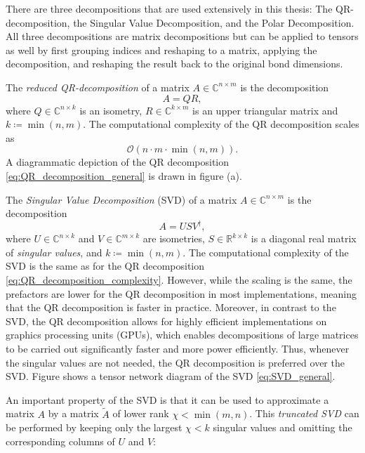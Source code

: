 There are three decompositions that are used extensively in this thesis: The QR-decomposition, the Singular Value Decomposition, and the Polar Decomposition. All three decompositions are matrix decompositions but can be applied to tensors as well by first grouping indices and reshaping to a matrix, applying the decomposition, and reshaping the result back to the original bond dimensions. \par
The \textit{reduced QR-decomposition} of a matrix $A \in \mathbb{C}^{n\times m}$ is the decomposition
\begin{equation}
	\label{eq:QR_decomposition_general}
	A = QR,
\end{equation}
where $Q\in\mathbb{C}^{n\times k}$ is an isometry, $R\in\mathbb{C}^{k\times m}$ is an upper triangular matrix and $k \coloneqq \min(n, m)$. The computational complexity of the QR decomposition scales as
\begin{equation}
	\label{eq:QR_decomposition_complexity}
	\mathcal{O}\left(n\cdot m\cdot\min(n, m)\right).
\end{equation}
A diagrammatic depiction of the QR decomposition \eqref{eq:QR_decomposition_general} is drawn in figure (a). \par
The \textit{Singular Value Decomposition} (SVD) of a matrix $A \in \mathbb{C}^{n\times m}$ is the decomposition
\begin{equation}
	\label{eq:SVD_general}
	A = USV^\dagger,
\end{equation}
where $U\in\mathbb{C}^{n\times k}$ and $V\in\mathbb{C}^{m\times k}$ are isometries, $S\in\mathbb{R}^{k\times k}$ is a diagonal real matrix of \textit{singular values}, and $k \coloneqq \min(n, m)$. The computational complexity of the SVD is the same as for the QR decomposition \eqref{eq:QR_decomposition_complexity}. However, while the scaling is the same, the prefactors are lower for the QR decomposition in most implementations, meaning that the QR decomposition is faster in practice. Moreover, in contrast to the SVD, the QR decomposition allows for highly efficient implementations on graphics processing units (GPUs), which enables decompositions of large matrices to be carried out significantly faster and more power efficiently. Thus, whenever the singular values are not needed, the QR decomposition is preferred over the SVD. Figure  shows a tensor network diagram of the SVD \eqref{eq:SVD_general}. \par
An important property of the SVD is that it can be used to approximate a matrix $A$ by a matrix $\tilde{A}$ of lower rank $\chi < \min(m, n)$. This \textit{truncated SVD} can be performed by keeping only the largest $\chi < k$ singular values and omitting the corresponding columns of $U$ and $V$:
